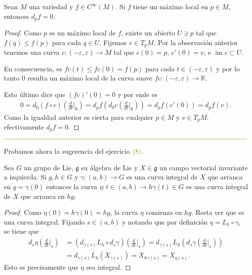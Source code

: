 \documentclass[11pt]{article}
\newcommand{\R}{\mathbb{R}}
\newcommand{\im}{\operatorname{im}}
\newcommand{\eps}{\varepsilon}
\newcommand{\paint}[1]{\color{color}{#1}}
\newenvironment{exercise}[2][Ejercicio]{\begin{trivlist}
\item[\hskip \labelsep \paint{{\bfseries #1}}\hskip \labelsep {\bfseries #2.}]}{\end{trivlist}}
\newenvironment{proposition}[2][Proposici\'on]{\begin{trivlist}
\item[\hskip \labelsep \paint{{\bfseries #1}}\hskip \labelsep {\bfseries #2.}]}{\end{trivlist}}
\begin{document}
\begin{exercise}{2} Sean $M$ una variedad y $f\in C^\infty(M)$. Si $f$ tiene un m\'aximo
local en $p\in M$, entonces $d_pf = 0$.
\end{exercise}
\begin{proof} Como $p$ es un m\'aximo local de $f$, existe un abierto $U \ni p$ tal que $f(q) \leq f(p)$ para cada $q \in U$. Fijemos $v \in T_pM$. Por la observaci\'on anterior tenemos una curva $c : (-\eps,\eps) \to M$ tal que $c(0) = p$, $c'(0) = v$, e $\im c \subset U$. 

En consecuencia, es $fc(t) \leq fc(0) = f(p)$ para cada $t \in (-\eps,\eps)$ y por lo tanto $0$ resulta un m\'aximo local de la curva suave $fc : (-\eps,\eps) \to \R$.

Esto último dice que $(fc)'(0) = 0$ y por ende es
\begin{align*}
0 = d_0(f\circ c)\left(\frac{d}{dt}\Big|_0\right)  = d_pf\left(d_0c\left(\frac{d}{dt}\Big|_0\right)\right) = d_pf(c'(0)) = d_pf(v).
\end{align*}
Como la igualdad anterior es cierta para cualquier $p \in M$ y $v \in T_pM$, efectivamente  $d_pf = 0$.
\end{proof}

\begin{center}
$\paint{
\rule{400pt}{0.5pt}
}$
\vspace{10pt}
\end{center}

Probamos ahora la sugerencia del ejercicio $\paint{(8)}$.

\begin{proposition}{2} Sea $G$ un grupo de Lie, $\mathfrak{g}$ su \'algebra de Lie y $X \in \mathfrak{g}$ un campo vectorial invariante a izquierda. Si $g, h \in G$ y $\gamma : (a,b) \to G$ es una curva integral de $X$ que arranca en $g = \gamma(0)$ entonces la curva $\eta : t \in (a,b) \to h\gamma(t) \in G$ es una curva integral de $X$ que arranca en $hg$. 
\end{proposition}
\begin{proof} Como $\eta(0) = h\gamma(0) = hg$, la curva $\eta$ comienza en $hg$. Resta ver que es una curva integral. Fijando $s \in (a,b)$ y notando que por definición $\eta = L_h \circ \gamma$, se tiene que
\begin{align*}
d_s \eta \left(\frac{d}{dt}\Bigg|_{s}\right) &= (d_{\gamma(s)}L_h \circ d_s\gamma) \left(\frac{d}{dt}\Bigg|_{s}\right) = d_{\gamma(s)}L_h \left( d_s\gamma \left(\frac{d}{dt}\Bigg|_{s}\right) \right)\\
& = d_{\gamma(s)}L_h(X_{\gamma(s)}) = X_{h\gamma(s)} = X_{\eta(s)}.
\end{align*}
Esto es precisamente que $\eta$ sea integral.
\end{proof}
\end{document}
